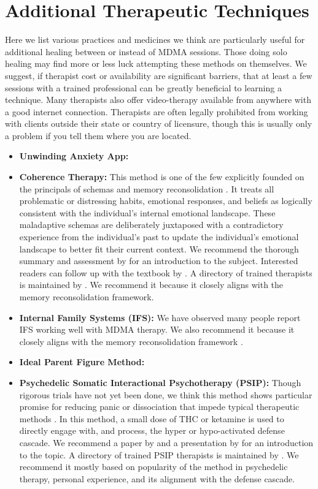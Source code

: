 \documentclass[12pt,letterpaper]{article}
\begin{document}
\section{Additional Therapeutic Techniques}
\label{healingPractices}
Here we list various practices and medicines we think are particularly useful for additional healing between or instead of MDMA sessions. Those doing solo healing may find more or less luck attempting these methods on themselves. We suggest, if therapist cost or availability are significant barriers, that at least a few sessions with a trained professional can be greatly beneficial to learning a technique. Many therapists also offer video-therapy available from anywhere with a good internet connection. Therapists are often legally prohibited from working with clients outside their state or country of licensure, though this is usually only a problem if you tell them where you are located.
\begin{itemize}
	\item \textbf{Unwinding Anxiety App:}
    \item \textbf{Coherence Therapy:} This method is one of the few explicitly founded on the principals of schemas and memory reconsolidation \cite{eckerUnlocking}. It treats all problematic or distressing habits, emotional responses, and beliefs as logically consistent with the individual's internal emotional landscape. These maladaptive schemas are deliberately juxtaposed with a contradictory experience from the individual's past to update the individual's emotional landscape to better fit their current context. We recommend the thorough summary and assessment by \textcite{lesswrongCoherenceTherapy} for an introduction to the subject. Interested readers can follow up with the textbook by \textcite{eckerUnlocking}. A directory of trained therapists is maintained by \textcite{coherenceDirectory}. We recommend it because it closely aligns with the memory reconsolidation framework.
    \item \textbf{Internal Family Systems (IFS):} We have observed many people report IFS working well with MDMA therapy. We also recommend it because it closely aligns with the memory reconsolidation framework \cite{eckerUnlocking}.
\label{def:ipf}
    \item \textbf{Ideal Parent Figure Method:} 
    \item \textbf{Psychedelic Somatic Interactional Psychotherapy (PSIP):} Though rigorous trials have not yet been done, we think this method shows particular promise for reducing panic or dissociation that impede typical therapeutic methods \cite{razviPSIP,ragnhildstveit2023cannabis}. In this method, a small dose of THC or ketamine is used to directly engage with, and process, the hyper or hypo-activated defense cascade. We recommend a paper by \textcite{razviPSIP} and a presentation by \textcite{razviPresentation} for an introduction to the topic. A directory of trained PSIP therapists is maintained by \textcite{psipDirectory}. We recommend it mostly based on popularity of the method in psychedelic therapy, personal experience, and its alignment with the defense cascade.
\end{itemize}
\end{document}
